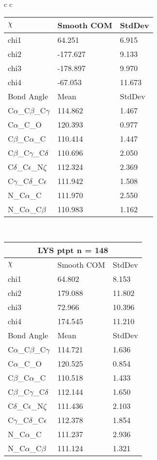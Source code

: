 \begin{longtable}{ c c }
\begin{tabular}{ l l l }
  $\chi$       & Smooth COM & StdDev \\ \midrule
  chi1 & 64.251 & 6.915 \\ 
  chi2 & -177.627 & 9.133 \\ 
  chi3 & -178.897 & 9.970 \\ 
  chi4 & -67.053 & 11.673 \\ \midrule
  Bond Angle   & Mean     & StdDev \\ \midrule
  C$\alpha$\_C$\beta$\_C$\gamma$ & 114.862 & 1.467\\
  C$\alpha$\_C\_O & 120.393 & 0.977\\
  C$\beta$\_C$\alpha$\_C & 110.414 & 1.447\\
  C$\beta$\_C$\gamma$\_C$\delta$ & 110.696 & 2.050\\
  C$\delta$\_C$\epsilon$\_N$\zeta$ & 112.324 & 2.369\\
  C$\gamma$\_C$\delta$\_C$\epsilon$ & 111.942 & 1.508\\
  N\_C$\alpha$\_C & 111.970 & 2.550\\
  N\_C$\alpha$\_C$\beta$ & 110.983 & 1.162\\
  \bottomrule
  \end{tabular}
  \\
  \begin{tabular}{ l l l }
  \toprule
  \multicolumn{3}{c}{LYS \textbf{ptpt} n = 148} \\ \toprule
  $\chi$       & Smooth COM & StdDev \\ \midrule
  chi1 & 64.802 & 8.153 \\ 
  chi2 & 179.088 & 11.802 \\ 
  chi3 & 72.966 & 10.396 \\ 
  chi4 & 174.545 & 11.210 \\ \midrule
  Bond Angle   & Mean     & StdDev \\ \midrule
  C$\alpha$\_C$\beta$\_C$\gamma$ & 114.721 & 1.636\\
  C$\alpha$\_C\_O & 120.525 & 0.854\\
  C$\beta$\_C$\alpha$\_C & 110.518 & 1.433\\
  C$\beta$\_C$\gamma$\_C$\delta$ & 112.144 & 1.650\\
  C$\delta$\_C$\epsilon$\_N$\zeta$ & 111.436 & 2.103\\
  C$\gamma$\_C$\delta$\_C$\epsilon$ & 112.378 & 1.854\\
  N\_C$\alpha$\_C & 111.237 & 2.936\\
  N\_C$\alpha$\_C$\beta$ & 111.124 & 1.321\\

\end{tabular}
\end{longtable}
